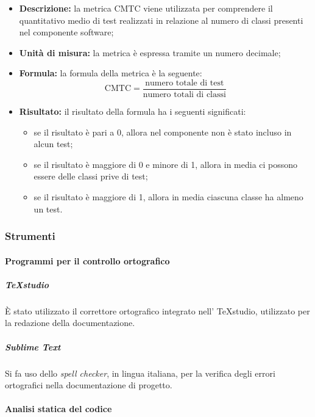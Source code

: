             \begin{itemize}
            \item \textbf{Descrizione: }
                la metrica CMTC viene utilizzata per comprendere il quantitativo medio di test realizzati in relazione al numero di classi presenti nel componente software;
            \item \textbf{Unità di misura: }
                la metrica è espressa tramite un numero decimale;
            \item \textbf{Formula: }
                la formula della metrica è la seguente:
                \[ 
                    \text{CMTC} = \frac{\text{numero totale di test}}{\text{numero totali di classi}}
                \]
            \item \textbf{Risultato: }
                il risultato della formula ha i seguenti significati:
                \begin{itemize}
                    \item se il risultato è pari a 0, allora nel componente non è stato incluso in alcun test;
                    \item se il risultato è maggiore di 0 e minore di 1, allora in media ci possono essere delle classi prive di test;
                    \item se il risultato è maggiore di 1, allora in media ciascuna classe ha almeno un test.
                \end{itemize}
            \end{itemize}


        \subsubsection{Strumenti}

            \paragraph{Programmi per il controllo ortografico}

                \subparagraph{TeXstudio}
                	È stato utilizzato il correttore ortografico integrato nell' TeXstudio, utilizzato per la redazione della documentazione.

                \subparagraph{Sublime Text}
                    Si fa uso dello \textit{spell checker}, in lingua italiana, per la verifica degli errori ortografici nella documentazione di progetto.

            \paragraph{Analisi statica del codice}

